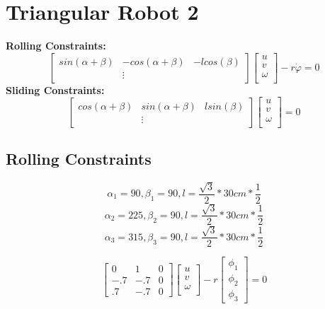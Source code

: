 \section{Triangular Robot 2}
\bf{Rolling Constraints:}
$$
\begin{bmatrix} 
sin(\alpha + \beta) & -cos(\alpha + \beta) & -lcos(\beta) \\
& \vdots &
\end{bmatrix}
\begin{bmatrix} 
u \\
v \\
\omega \\
\end{bmatrix} 
-
r \dot{\varphi}
= 0
$$
\bf{Sliding Constraints:}
$$
\begin{bmatrix} 
cos(\alpha + \beta) & sin(\alpha + \beta) & lsin(\beta) \\
& \vdots &
\end{bmatrix}
\begin{bmatrix} 
u \\
v \\
\omega \\
\end{bmatrix} 
= 0
$$



\subsection{Rolling Constraints}
$$
\alpha_1 =  90, 
\beta_1 = 90,
l = \dfrac{\sqrt{3}}{2} * 30cm * \dfrac{1}{2}
$$
$$
\alpha_2 =  225, 
\beta_2 = 90,
l = \dfrac{\sqrt{3}}{2} * 30cm * \dfrac{1}{2}
$$
$$
\alpha_3 =  315, 
\beta_3 = 90,
l = \dfrac{\sqrt{3}}{2} * 30cm * \dfrac{1}{2}
$$

$$
\begin{bmatrix} 
0 & 1 & 0\\
-.7 & -.7 & 0\\
.7 & -.7 & 0
\end{bmatrix} 
\begin{bmatrix} 
u \\
v \\
\omega \\
\end{bmatrix} 
- r 
 \begin{bmatrix} 
\phi_1 \\
\phi_2 \\
\phi_3
\end{bmatrix}
= 0
$$


